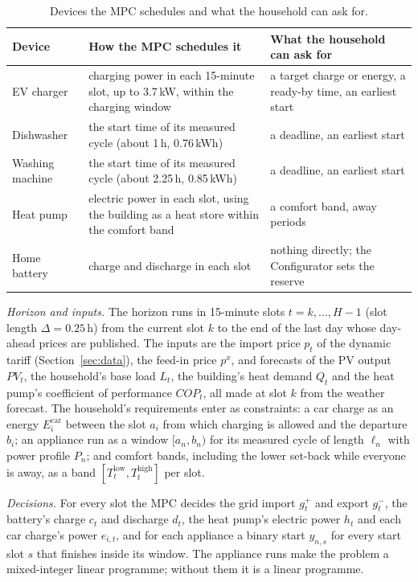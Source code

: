 \begin{table}[htbp]
\caption{Devices the MPC schedules and what the household can ask for.}
\label{tab:devices}
\small
\begin{tabularx}{\textwidth}{@{}>{\raggedright\arraybackslash}p{2.6cm}X>{\raggedright\arraybackslash}p{4.4cm}@{}}
\toprule
Device & How the MPC schedules it & What the household can ask for \\
\midrule
EV charger & charging power in each 15-minute slot, up to 3.7\,kW, within the charging window & a target charge or energy, a ready-by time, an earliest start \\
Dishwasher & the start time of its measured cycle (about 1\,h, 0.76\,kWh) & a deadline, an earliest start \\
Washing machine & the start time of its measured cycle (about 2.25\,h, 0.85\,kWh) & a deadline, an earliest start \\
Heat pump & electric power in each slot, using the building as a heat store within the comfort band & a comfort band, away periods \\
Home battery & charge and discharge in each slot & nothing directly; the Configurator sets the reserve \\
\bottomrule
\end{tabularx}
\end{table}

\textit{Horizon and inputs.} The horizon runs in 15-minute slots
$t = k, \dots, H-1$ (slot length $\Delta = 0.25$\,h) from the current
slot $k$ to the end of the last day whose day-ahead prices are
published. The inputs are the import price $p_t$ of the dynamic tariff
(Section~\ref{sec:data}), the feed-in price $p^{x}$, and forecasts of the
PV output $\mathit{PV}_t$, the household's base load $L_t$, the
building's heat demand $Q_t$ and the heat pump's coefficient of
performance $\mathit{COP}_t$, all made at slot $k$ from the weather
forecast. The household's requirements enter as constraints:
a car charge as an energy $E^{\mathrm{car}}_i$ between the slot $a_i$ from
which charging is allowed and the departure $b_i$; an appliance run as a
window $[a_n, b_n)$ for its measured cycle of length $\ell_n$ with power
profile $P_n$; and comfort bands, including the lower set-back while
everyone is away, as a band $[T^{\mathrm{low}}_t, T^{\mathrm{high}}_t]$ per
slot.

\textit{Decisions.} For every slot the MPC decides the grid import
$g^{+}_t$ and export $g^{-}_t$, the battery's charge $c_t$ and discharge
$d_t$, the heat pump's electric power $h_t$ and each car charge's power
$e_{i,t}$, and for each appliance a binary start $y_{n,s}$ for every
start slot $s$ that finishes inside its window. The appliance runs make
the problem a mixed-integer linear programme; without them it is a
linear programme.

